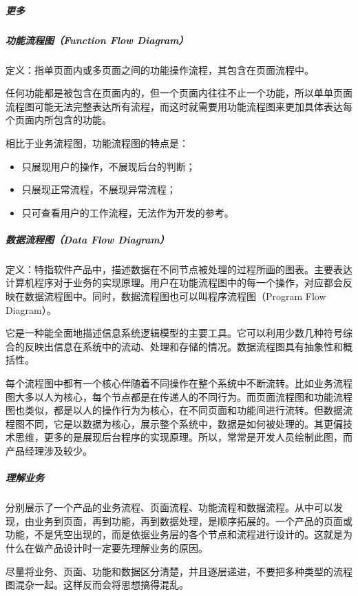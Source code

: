 \documentclass[letterpaper,10pt,english]{sphinxmanual}
\begin{document}
\subparagraph{更多}
\label{\detokenize{chapter_knowledge/flow_chart:id12}}


\subparagraph{功能流程图（Function Flow Diagram）}
\label{\detokenize{chapter_knowledge/flow_chart:function-flow-diagram}}
定义：指单页面内或多页面之间的功能操作流程，其包含在页面流程中。

任何功能都是被包含在页面内的，但一个页面内往往不止一个功能，所以单单页面流程图可能无法完整表达所有流程，而这时就需要用功能流程图来更加具体表达每个页面内所包含的功能。

相比于业务流程图，功能流程图的特点是：
\begin{itemize}
\item {} 
只展现用户的操作，不展现后台的判断；

\item {} 
只展现正常流程，不展现异常流程；

\item {} 
只可查看用户的工作流程，无法作为开发的参考。

\end{itemize}


\subparagraph{数据流程图（Data Flow Diagram）}
\label{\detokenize{chapter_knowledge/flow_chart:data-flow-diagram}}
定义：特指软件产品中，描述数据在不同节点被处理的过程所画的图表。主要表达计算机程序对于业务的实现原理。用户在功能流程图中的每一个操作，对应都会反映在数据流程图中。同时，数据流程图也可以叫程序流程图（Program
Flow Diagram）。

它是一种能全面地描述信息系统逻辑模型的主要工具。它可以利用少数几种符号综合的反映出信息在系统中的流动、处理和存储的情况。数据流程图具有抽象性和概括性。

每个流程图中都有一个核心伴随着不同操作在整个系统中不断流转。比如业务流程图大多以人为核心，每个节点都是在传递人的不同行为。而页面流程图和功能流程图也类似，都是以人的操作行为为核心，在不同页面和功能间进行流转。但数据流程图不同，它是以数据为核心，展示整个系统中，数据是如何被处理的。其更偏技术思维，更多的是展现后台程序的实现原理。所以，常常是开发人员绘制此图，而产品经理涉及较少。


\subparagraph{理解业务}
\label{\detokenize{chapter_knowledge/flow_chart:id13}}
分别展示了一个产品的业务流程、页面流程、功能流程和数据流程。从中可以发现，由业务到页面，再到功能，再到数据处理，是顺序拓展的。一个产品的页面或功能，不是凭空出现的，而是依据业务层的各个节点和流程进行设计的。这就是为什么在做产品设计时一定要先理解业务的原因。

尽量将业务、页面、功能和数据区分清楚，并且逐层递进，不要把多种类型的流程图混杂一起。这样反而会将思想搞得混乱。
\end{document}
